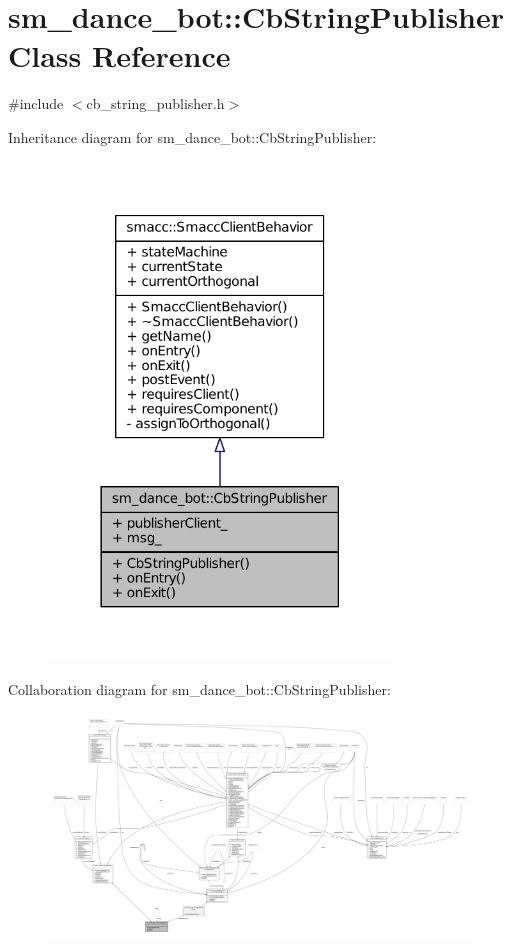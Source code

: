 \hypertarget{classsm__dance__bot_1_1CbStringPublisher}{}\section{sm\+\_\+dance\+\_\+bot\+:\+:Cb\+String\+Publisher Class Reference}
\label{classsm__dance__bot_1_1CbStringPublisher}


{\ttfamily \#include $<$cb\+\_\+string\+\_\+publisher.\+h$>$}



Inheritance diagram for sm\+\_\+dance\+\_\+bot\+:\+:Cb\+String\+Publisher\+:
\nopagebreak
\begin{figure}[H]
\begin{center}
\leavevmode
\includegraphics[width=258pt]{classsm__dance__bot_1_1CbStringPublisher__inherit__graph}
\end{center}
\end{figure}


Collaboration diagram for sm\+\_\+dance\+\_\+bot\+:\+:Cb\+String\+Publisher\+:
\nopagebreak
\begin{figure}[H]
\begin{center}
\leavevmode
\includegraphics[width=350pt]{classsm__dance__bot_1_1CbStringPublisher__coll__graph}
\end{center}
\end{figure}
